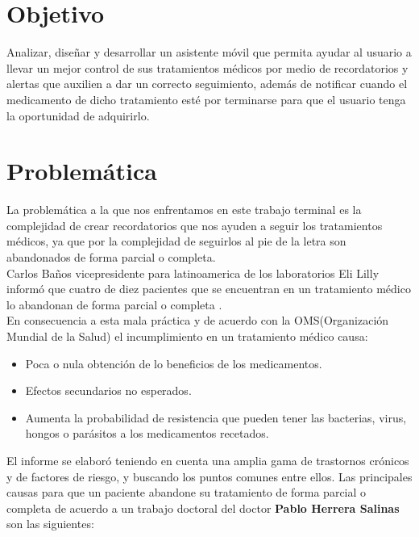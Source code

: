 \section{Objetivo}
Analizar, diseñar y desarrollar un asistente móvil que permita ayudar al usuario a llevar un mejor control de sus tratamientos médicos por medio de recordatorios y alertas que auxilien a dar un correcto seguimiento, además de notificar cuando el medicamento de dicho tratamiento esté por terminarse para que el usuario tenga la oportunidad de adquirirlo.

\section{Problemática}

La problemática a la que nos enfrentamos en este trabajo terminal es la complejidad de crear recordatorios que nos ayuden a seguir los tratamientos médicos, ya que por la complejidad de seguirlos al pie de la letra son abandonados de forma parcial o completa.\\
Carlos Baños vicepresidente para latinoamerica de los laboratorios Eli Lilly informó que cuatro de diez pacientes que se encuentran en un tratamiento médico lo abandonan de forma parcial o completa \cite{Referencia9}.\\
En consecuencia a esta mala práctica y de acuerdo con la OMS(Organización Mundial de la Salud)\cite{Referencia10} el incumplimiento en un tratamiento médico causa:
\begin{itemize}
	\item Poca o nula obtención de lo beneficios de los medicamentos.
	\item Efectos secundarios no esperados.
	\item Aumenta la probabilidad de resistencia que pueden tener las bacterias, virus, hongos o parásitos a los medicamentos recetados.
\end{itemize}
El informe se elaboró teniendo en cuenta una amplia gama de trastornos crónicos y de factores de riesgo, y buscando los puntos comunes entre ellos\cite{Referencia11}.
Las principales causas para que un paciente abandone su tratamiento de forma parcial o completa de acuerdo a un trabajo doctoral del doctor \textbf{Pablo Herrera Salinas}\cite{Referencia12} son las siguientes:
